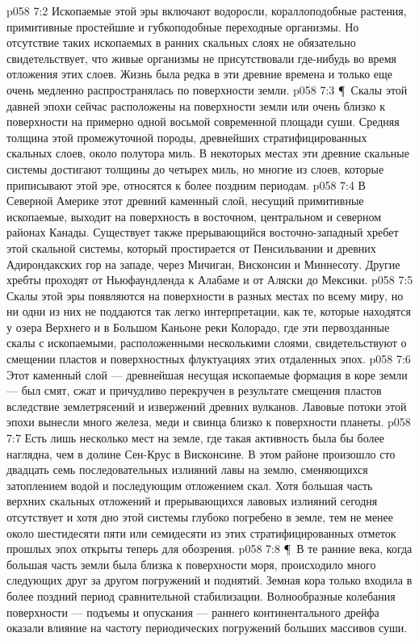 \vs p058 7:2 Ископаемые этой эры включают водоросли, кораллоподобные растения, примитивные простейшие и губкоподобные переходные организмы. Но отсутствие таких ископаемых в ранних скальных слоях не обязательно свидетельствует, что живые организмы не присутствовали где\hyp{}нибудь во время отложения этих слоев. Жизнь была редка в эти древние времена и только еще очень медленно распространялась по поверхности земли.
\vs p058 7:3 \P\ Скалы этой давней эпохи сейчас расположены на поверхности земли или очень близко к поверхности на примерно одной восьмой современной площади суши. Средняя толщина этой промежуточной породы, древнейших стратифицированных скальных слоев, около полутора миль. В некоторых местах эти древние скальные системы достигают толщины до четырех миль, но многие из слоев, которые приписывают этой эре, относятся к более поздним периодам.
\vs p058 7:4 В Северной Америке этот древний каменный слой, несущий примитивные ископаемые, выходит на поверхность в восточном, центральном и северном районах Канады. Существует также прерывающийся восточно\hyp{}западный хребет этой скальной системы, который простирается от Пенсильвании и древних Адирондакских гор на западе, через Мичиган, Висконсин и Миннесоту. Другие хребты проходят от Ньюфаундленда к Алабаме и от Аляски до Мексики.
\vs p058 7:5 Скалы этой эры появляются на поверхности в разных местах по всему миру, но ни одни из них не поддаются так легко интерпретации, как те, которые находятся у озера Верхнего и в Большом Каньоне реки Колорадо, где эти первозданные скалы с ископаемыми, расположенными несколькими слоями, свидетельствуют о смещении пластов и поверхностных флуктуациях этих отдаленных эпох.
\vs p058 7:6 Этот каменный слой --- древнейшая несущая ископаемые формация в коре земли --- был смят, сжат и причудливо перекручен в результате смещения пластов вследствие землетрясений и извержений древних вулканов. Лавовые потоки этой эпохи вынесли много железа, меди и свинца близко к поверхности планеты.
\vs p058 7:7 Есть лишь несколько мест на земле, где такая активность была бы более наглядна, чем в долине Сен\hyp{}Крус в Висконсине. В этом районе произошло сто двадцать семь последовательных излияний лавы на землю, сменяющихся затоплением водой и последующим отложением скал. Хотя большая часть верхних скальных отложений и прерывающихся лавовых излияний сегодня отсутствует и хотя дно этой системы глубоко погребено в земле, тем не менее около шестидесяти пяти или семидесяти из этих стратифицированных отметок прошлых эпох открыты теперь для обозрения.
\vs p058 7:8 \P\ В те ранние века, когда большая часть земли была близка к поверхности моря, происходило много следующих друг за другом погружений и поднятий. Земная кора только входила в более поздний период сравнительной стабилизации. Волнообразные колебания поверхности --- подъемы и опускания --- раннего континентального дрейфа оказали влияние на частоту периодических погружений больших массивов суши.
